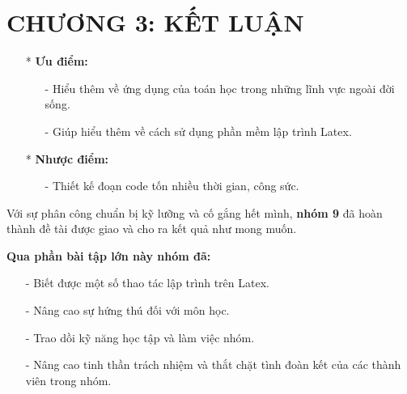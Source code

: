 \documentclass[12pt,a4paper]{article}
\begin{document}
\section*{CHƯƠNG 3: KẾT LUẬN}
\begin{itemize}
	\item[*] \textbf{Ưu điểm:}
	      \begin{itemize}
		      \item[-] Hiểu thêm về ứng dụng của toán học trong những lĩnh vực ngoài đời sống.
		      \item[-] Giúp hiểu thêm về cách sử dụng phần mềm lập trình Latex.
	      \end{itemize}
	\item[*] \textbf{Nhược điểm:}
	      \begin{itemize}
		      \item[-] Thiết kế đoạn code tốn nhiều thời gian, công sức.
	      \end{itemize}
\end{itemize}

\vspace{2em}
Với sự phân công chuẩn bị kỹ lưỡng và cố gắng hết mình, \textbf{nhóm 9} đã hoàn thành đề tài được giao và cho ra kết quả như mong muốn.

\vspace{2em}
\textbf{Qua phần bài tập lớn này nhóm đã:}
\begin{itemize}
	\item[-] Biết được một số thao tác lập trình trên Latex.
	\item[-] Nâng cao sự hứng thú đối với môn học.
	\item[-] Trao dồi kỹ năng học tập và làm việc nhóm.
	\item[-] Nâng cao tinh thần trách nhiệm và thắt chặt tình đoàn kết của các thành viên trong nhóm.
\end{itemize}

\newpage
{}
\end{document}
